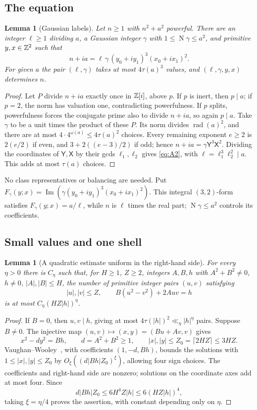 \documentclass[11pt,reqno]{amsart}
\newtheorem{lemma}[theorem]{Lemma}
\theoremstyle{definition}
\theoremstyle{remark}
\numberwithin{equation}{section}
\newcommand{\Nm}{\operatorname{N}}
\begin{document}
\subsection{The equation}
\begin{lemma}[Gaussian labels]\label{lem:A2labels}
Let $n\ge1$ with $n^2+a^2$ powerful. There are an integer $\ell\ge1$ dividing
$a$, a Gaussian integer $\gamma$ with $1\le\Nm\gamma\le a^2$, and primitive
$y,x\in\mathbb Z^2$ such that
\begin{equation}\label{eq:A2}
 n+ia=\ell\,\gamma\,(y_0+iy_1)^3(x_0+ix_1)^2 .
\end{equation}
For given $a$ the pair $(\ell,\gamma)$ takes at most $4\tau(a)^3$ values, and
$(\ell,\gamma,y,x)$ determines $n$.
\end{lemma}
\begin{proof}
Let $P$ divide $n+ia$ exactly once in $\mathbb Z[i]$, above $p$.
If $p$ is inert, then $p\mid a$; if $p=2$, the norm has valuation
one, contradicting powerfulness. If $p$ splits, powerfulness forces
the conjugate prime also to divide $n+ia$, so again $p\mid a$.
Take $\gamma$ to be a unit times the product of these $P$.
Its norm divides $\operatorname{rad}(a)^2$, and there are at most
$4\cdot4^{\omega(a)}\le4\tau(a)^2$ choices. Every remaining exponent
$e\ge2$ is $2(e/2)$ if even, and $3+2((e-3)/2)$ if odd; hence
$n+ia=\gamma\mathsf Y^3\mathsf X^2$.
Dividing the coordinates of $\mathsf Y,\mathsf X$ by their gcds
$\ell_1,\ell_2$ gives \eqref{eq:A2}, with
$\ell=\ell_1^3\ell_2^2\mid a$. This adds at most $\tau(a)$ choices.
\end{proof}
No class representatives or balancing are needed. Put
$F_\gamma(y;x)=\operatorname{Im}(\gamma(y_0+iy_1)^3(x_0+ix_1)^2)$.
This integral $(3,2)$-form satisfies $F_\gamma(y;x)=a/\ell$,
while $n$ is $\ell$ times the real part; $\Nm\gamma\le a^2$
controls its coefficients.

\subsection{Small values and one shell}
\begin{lemma}[A quadratic estimate uniform in the right-hand side]
\label{lem:A2quaduniform}
For every $\eta>0$ there is $C_\eta$ such that, for
$H\ge1$, $Z\ge2$, integers $A,B,h$ with
$A^2+B^2\ne0$, $h\ne0$, $|A|,|B|\le H$, the number of primitive
integer pairs $(u,v)$ satisfying
\[
 |u|,|v|\le Z,\qquad B(u^2-v^2)+2Auv=h
\]
is at most $C_\eta(HZ|h|)^\eta$.
\end{lemma}
\begin{proof}
If $B=0$, then $u,v\mid h$, giving at most $4\tau(|h|)^2\ll_\eta|h|^\eta$
pairs. Suppose $B\ne0$. The injective map
$(u,v)\mapsto(x,y)=(Bu+Av,v)$ gives
\[
 x^2-dy^2=Bh,\qquad d=A^2+B^2\ge1,\qquad
 |x|,|y|\le Z_0=\lceil2HZ\rceil\le3HZ.
\]
Vaughan--Wooley~\cite[Lemma~3.5]{vw}, with coefficients $(1,-d,Bh)$,
bounds the solutions with $1\le|x|,|y|\le Z_0$ by
$O_\xi((d|Bh|Z_0)^\xi)$, allowing four sign choices.
The coefficients and right-hand side are nonzero; solutions on the
coordinate axes add at most four. Since
\[
 d|Bh|Z_0\le6H^4Z|h|\le6(HZ|h|)^4,
\]
taking $\xi=\eta/4$ proves the assertion, with constant depending only on $\eta$.
\end{proof}
\end{document}
